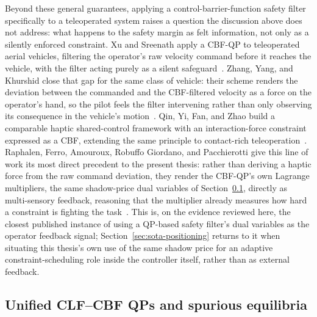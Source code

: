 \documentclass[12pt,a4paper,twoside,openright]{report}
\begin{document}
\label{sec:sota-teleop-barriers}
Beyond these general guarantees, applying a control-barrier-function safety filter specifically to a teleoperated system raises a question the discussion above does not address: what happens to the safety margin as felt information, not only as a silently enforced constraint. Xu and Sreenath apply a CBF-QP to teleoperated aerial vehicles, filtering the operator's raw velocity command before it reaches the vehicle, with the filter acting purely as a silent safeguard~\cite{xu2018safeteleoperation}. Zhang, Yang, and Khurshid close that gap for the same class of vehicle: their scheme renders the deviation between the commanded and the CBF-filtered velocity as a force on the operator's hand, so the pilot feels the filter intervening rather than only observing its consequence in the vehicle's motion~\cite{zhang2020hapticuav}. Qin, Yi, Fan, and Zhao build a comparable haptic shared-control framework with an interaction-force constraint expressed as a CBF, extending the same principle to contact-rich teleoperation~\cite{qin2025hapticcbf}. Raphalen, Ferro, Amouroux, Robuffo Giordano, and Pacchierotti give this line of work its most direct precedent to the present thesis: rather than deriving a haptic force from the raw command deviation, they render the CBF-QP's own Lagrange multipliers, the same shadow-price dual variables of Section~\ref{sec:sota-clf-cbf-qp}, directly as multi-sensory feedback, reasoning that the multiplier already measures how hard a constraint is fighting the task~\cite{raphalen2026feeling}. This is, on the evidence reviewed here, the closest published instance of using a QP-based safety filter's dual variables as the operator feedback signal; Section~\ref{sec:sota-positioning} returns to it when situating this thesis's own use of the same shadow price for an adaptive constraint-scheduling role inside the controller itself, rather than as external feedback.

\subsection{Unified CLF--CBF QPs and spurious equilibria}
\label{sec:sota-clf-cbf-qp}
\end{document}

